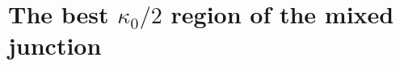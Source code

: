 \section{The best \texorpdfstring{$\kappa_0/2$}{kappa0/2} region of the mixed junction}
\label{sec:best}
